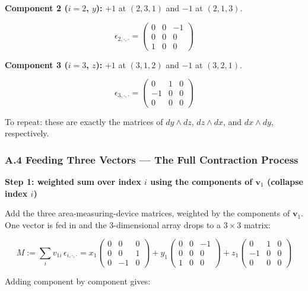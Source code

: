 \documentclass[a4paper,12pt,openany]{book}
\begin{document}
\textbf{Component 2 (\(i=2\), \(y\)):} \(+1\) at \((2,3,1)\) and \(-1\)
at \((2,1,3)\).

\[\epsilon_{2,\cdot,\cdot} = \begin{pmatrix} 0 & 0 & -1 \\ 0 & 0 & 0 \\ 1 & 0 & 0 \end{pmatrix}\]

\textbf{Component 3 (\(i=3\), \(z\)):} \(+1\) at \((3,1,2)\) and \(-1\)
at \((3,2,1)\).

\[\epsilon_{3,\cdot,\cdot} = \begin{pmatrix} 0 & 1 & 0 \\ -1 & 0 & 0 \\ 0 & 0 & 0 \end{pmatrix}\]

To repeat: these are exactly the matrices of \(dy \wedge dz\),
\(dz \wedge dx\), and \(dx \wedge dy\), respectively.

\hypertarget{a.4-feeding-three-vectors-the-full-contraction-process}{%
\subsubsection*{A.4 Feeding Three Vectors — The Full Contraction
Process}\label{a.4-feeding-three-vectors-the-full-contraction-process}}

\textbf{Step 1: weighted sum over index \(i\) using the components of
\(\mathbf{v}_1\) (collapse index \(i\))}

Add the three area-measuring-device matrices, weighted by the components
of \(\mathbf{v}_1\). One vector is fed in and the \(3\)-dimensional
array drops to a \(3 \times 3\) matrix:

\[M := \sum_i v_{1i}\, \epsilon_{i,\cdot,\cdot} = x_1 \begin{pmatrix} 0 & 0 & 0 \\ 0 & 0 & 1 \\ 0 & -1 & 0 \end{pmatrix} + y_1 \begin{pmatrix} 0 & 0 & -1 \\ 0 & 0 & 0 \\ 1 & 0 & 0 \end{pmatrix} + z_1 \begin{pmatrix} 0 & 1 & 0 \\ -1 & 0 & 0 \\ 0 & 0 & 0 \end{pmatrix}\]

Adding component by component gives:
\end{document}
